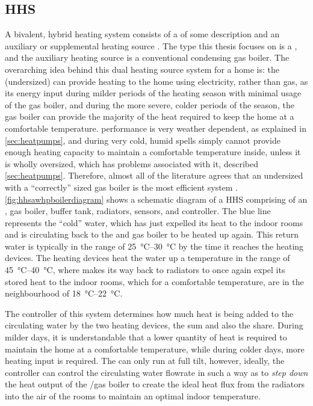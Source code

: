 \subsection{HHS}
A bivalent, hybrid \HP heating system consists of a \HP of some description and an auxiliary or supplemental heating source \cite{blackman_study_2019}. The \HP type this thesis focuses on is a \AWHP, and the auxiliary heating source is a conventional condensing gas boiler. The overarching idea behind this dual heating source system for a home is: the (undersized) \HP can provide heating to the home using electricity, rather than gas, as its energy input during milder periods of the heating season with minimal usage of the gas boiler, and during the more severe, colder periods of the season, the gas boiler can provide the majority of the heat required to keep the home at a comfortable temperature. \AWHP performance is very weather dependent, as explained in \cref{sec:heatpumps}, and during very cold, humid spells simply cannot provide enough heating capacity to maintain a comfortable temperature inside, unless it is wholly oversized, which has problems associated with it, described \cref{sec:heatpumps}. Therefore, almost all of the literature agrees that an undersized \HP with a ``correctly'' sized gas boiler is the most efficient system \cite{park_performance_2014,bagarella_annual_2016,dongellini_influence_2021,rauschkolb_cost-optimal_2020}. \cref{fig:hhsawhpboilerdiagram} shows a schematic diagram of a \ac{HHS} comprising of an \AWHP, gas boiler, buffer tank, radiators, sensors, and controller. The blue line represents the ``cold'' water, which has just expelled its heat to the indoor rooms and is circulating back to the \HP and gas boiler to be heated up again. This return water is typically in the range of \qtyrange{25}{30}{\celsius} by the time it reaches the heating devices. The heating devices heat the water up a temperature in the range of \qtyrange{45}{40}{\celsius}, where makes its way back to radiators to once again expel its stored heat to the indoor rooms, which for a comfortable temperature, are in the neighbourhood of \qtyrange{18}{22}{\celsius}.

The controller of this system determines how much heat is being added to the circulating water by the two heating devices, the sum and also the share. During milder days, it is understandable that a lower quantity of heat is required to maintain the home at a comfortable temperature, while during colder days, more heating input is required. The \AWHP can only run at full tilt, however, ideally, the controller can control the circulating water flowrate in such a way as to \textit{step down} the heat output of the \AWHP/gas boiler to create the ideal heat flux from the radiators into the air of the rooms to maintain an optimal indoor temperature.

